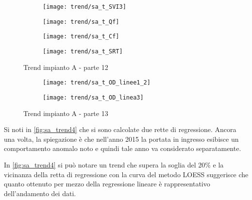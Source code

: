 \begin{sidewaysfigure}[h]\ContinuedFloat
	\renewcommand*\thesubfigure{(\arabic{subfigure})}
	\begin{subfigure}{0.49\textwidth}
		\texttt{[image: trend/sa\_t\_SVI3]}
		\caption{}
		\centering
	\end{subfigure}
	\begin{subfigure}{0.49\textwidth}
		\texttt{[image: trend/sa\_t\_Qf]}
		\caption{}
		\centering
	\end{subfigure}

	\begin{subfigure}{0.49\textwidth}
		\texttt{[image: trend/sa\_t\_Cf]}
		\caption{}
		\centering
	\end{subfigure}
	\begin{subfigure}{0.49\textwidth}
		\texttt{[image: trend/sa\_t\_SRT]}
		\caption{}
		\centering
	\end{subfigure}
	\caption{Trend impianto A - parte 12}
\end{sidewaysfigure}

\begin{sidewaysfigure}[h]\ContinuedFloat
	\renewcommand*\thesubfigure{(\arabic{subfigure})}
	\begin{subfigure}{0.49\textwidth}
		\texttt{[image: trend/sa\_t\_OD\_linee1\_2]}
		\caption{}
		\centering
	\end{subfigure}
	\begin{subfigure}{0.49\textwidth}
		\texttt{[image: trend/sa\_t\_OD\_linea3]}
		\caption{}
		\centering
	\end{subfigure}
\caption{Trend impianto A - parte 13}
\end{sidewaysfigure}

Si noti in \autoref{fig:sa_trend4} che si sono calcolate due rette di regressione. Ancora una volta, la spiegazione è che nell'anno 2015 la portata in ingresso esibisce un comportamento anomalo noto e quindi tale anno va considerato separatamente.

In \autoref{fig:sa_trend4} si può notare un trend che supera la soglia del 20\% e la vicinanza della retta di regressione con la curva del metodo LOESS suggerisce che quanto ottenuto per mezzo della regressione lineare è rappresentativo dell'andamento dei dati.

